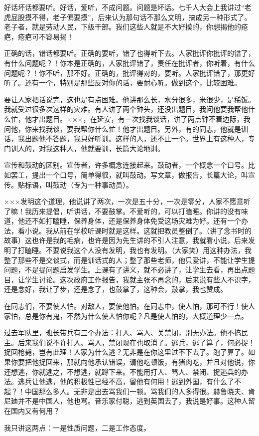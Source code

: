 好话坏话都要听。好话，爱听，不成问题。问题是坏话。七千人大会上我讲过“老虎屁股摸不得，老子偏要摸”，后来认为那句话不那么文明，搞成另一种形式了。老子者，就是劳动人民，下级干部。我们这些人就是不大好摸的，你想揭他的疮疤，疮疤可不容易揭！

正确的话，错话都要听。正确的要听，错了也得听下去。人家批评你批评的镨了，有什么问题呢？！你本是正确的，人家批评错了，责任在批评者，你听着，有什么问题呢？！你不听，那不好。正确的，批评得对的，要听。人家批评错了，那更好听了。还有一个，特别是那些反对你的话，要耐心听。做到这个，比较困难。

要让人家把话说完，这也是有点困难。他讲那么长，水分很多，米很少，是稀饭。我就受过很多次这样的灾难。有人讲了两个钟头，还没出题目，我问他要我帮他什么忙，他才出题目。×××，在延安，有一次找我谈话，讲了两点钟不着边际，我问他，你来找我谈，要我帮你什么忙！他才出题目。另外，有的同志，他就是训话，我出题他不答题，我只好听训。这样的人，还不止一个。世界上有这种人，专门训人的，对我这种人，他就要训，长篇大论地训。

宣传和鼓动的区别。宣传者，许多概念连接起来。鼓动者，一个概念一个口号。比如罢工，提出一个口号，简单得很，就叫鼓动。写文章，做报告，长篇大论，叫宣传。贴标语，叫鼓动（专为一种事动员）。

×××发明这个道理，他说讲了两次，一次是五十分，一次是零分，人家不愿意听了嘛！我历来提倡，听讲话，不要鼓掌。不爱听的，可以打瞌睡。你讲的没有味道，他还不如打瞌睡，保养身体，还是保养身体免受这场灾难为好。还有一个办法，看小说。我从前在学校听课时就是这样。这就把教员整倒了。（讲了念书时的故事）这也许是我的毛病，也许是因为先生讲的不引人注意，我就看小说，后来发明了打瞌睡。不要说我这个人没有发明，我也有发明。（大家笑）用这种办法，我整了那些不是交谈式，而是训话式的人；整了那些老师，他只爱讲，不能让学生提问题，不是提问题启发学生。上课有了讲义，就不必讲了，让学生去看，再出点题目，让学生讨论。这次政府工作报告，我就主张不再念的，后来说有些人不识字，还是念好，我让了步，还是念了，也鼓掌了，这种会，鼓掌，我也赞成。

在同志们，不要使人怕。对敌人，要使他怕。在同志中，使人怕，那可不行！使人家怕，总是你有鬼，不然为什么使人怕你呢？凡是使人怕的，大概道理少一点。

过去军队里，班长带兵有三个办法：打人、骂人、关禁闭，别无办法。他不搞民主。后来我们说不许打人、骂人，禁闭现在也取消了。逃兵，逃了算了，何必捉！捉回枪毙，岂有此理！人家为什么逃？无非是在你这里过不下去了。跑了算了。如果你要把他捉回来，那就向他承认错误，请他吃顿饭，有猪肉吃，并且对他说，你还想逃，你就逃之，不想逃，就蹲下来。不能用打人、骂人、禁闭、捉逃兵的办法。逃兵让他逃，他的积极性已经不高，留他有何用！逃到外国，有什么了不起？！中国那么多人。无非是出去骂我们一顿。骂我们的人多得很。赫鲁晓夫、肯尼廸并不是中国人，他也骂。音乐家付聪，逃到英国去了，我说是好事。这种人留在国内又有何用？

我只讲这两点：一是性质问题，二是工作态度。


